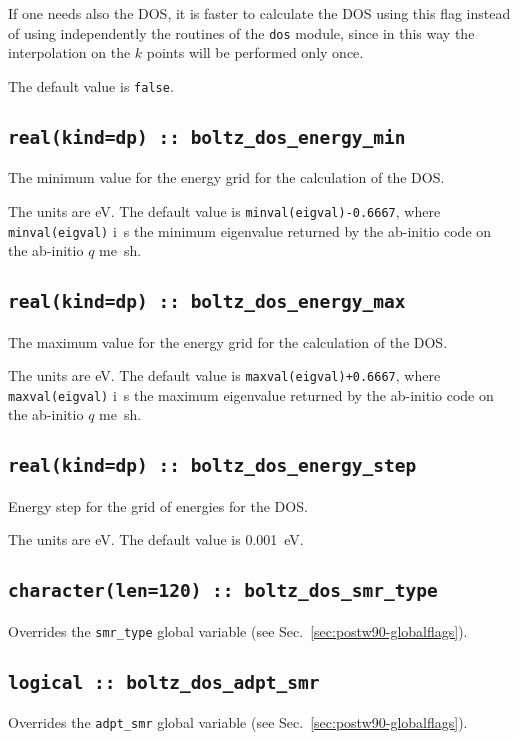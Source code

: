 If one needs also the DOS, it is faster to calculate the DOS using
this flag instead of using independently the routines of the {\tt dos} module, since in this way the interpolation on the $k$ points will be performed only once.

The default value is \verb#false#.

\subsection[boltz\_dos\_energy\_min]{\tt real(kind=dp) :: boltz\_dos\_energy\_min}
The minimum value for the energy grid for the calculation of the DOS.

The units are eV.
The default value is {\tt minval(eigval)-0.6667}, where  {\tt minval(eigval)} i\
s the minimum eigenvalue returned by the ab-initio code on the ab-initio $q$ me\
sh.

\subsection[boltz\_dos\_energy\_max]{\tt real(kind=dp) :: boltz\_dos\_energy\_max}
The maximum value for the energy grid for the calculation of the DOS.

The units are eV.
The default value is {\tt maxval(eigval)+0.6667}, where  {\tt maxval(eigval)} i\
s the maximum eigenvalue returned by the ab-initio code on the ab-initio $q$ me\
sh.

\subsection[boltz\_dos\_energy\_step]{\tt real(kind=dp) :: boltz\_dos\_energy\_step}
Energy step for the grid of energies for the DOS.

The units are eV.
The default value is 0.001~eV.

\subsection[boltz\_dos\_smr\_type]{\tt character(len=120) :: boltz\_dos\_smr\_type}
Overrides the \verb#smr_type# global variable (see
Sec.~\ref{sec:postw90-globalflags}).

\subsection[boltz\_dos\_adpt\_smr]{\tt logical :: boltz\_dos\_adpt\_smr}
Overrides the \verb#adpt_smr# global variable (see
Sec.~\ref{sec:postw90-globalflags}).

